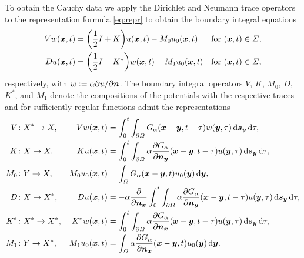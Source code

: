 \documentclass[a4paper,11pt]{article}
\begin{document}
To obtain the Cauchy data we apply the Dirichlet and Neumann trace operators to the representation formula \eqref{eq:repr} to obtain the boundary integral equations \cite{Cos1990,Cos2004,Noo1988,DohNiiSte2018}
\begin{align*}
  Vw({{\bm{x}}},t) &= \bigg(\frac{1}{2} I + K \bigg) u({{\bm{x}}},t) - M_0 u_0({{\bm{x}}},t) &&\text{for } ({{\bm{x}}},t) \in \Sigma, \\
  Du({{\bm{x}}},t) &= \bigg(\frac{1}{2} I - K^\ast \bigg) w({{\bm{x}}},t) - M_1 u_0({{\bm{x}}},t) &&\text{for } ({{\bm{x}}},t) \in \Sigma,
\end{align*}
respectively, with $w := \alpha\partial u/\partial {\ensuremath{{\bm{n}}}} $. The boundary integral operators $V$, $K$, $M_0$, $D$, $K^\ast$, and $M_1$ denote the compositions of the potentials with the respective traces and for sufficiently regular functions admit the representations
\begin{align*}
  V &\colon X^\ast \to X, &Vw({{\bm{x}}},t) &= \int_0^t \int_{\partial\Omega} G_\alpha({{\bm{x}}}-{{\bm{y}}},t-\tau) w({{\bm{y}}},\tau) \,{\mathrm{d}}{{\bm{s}}}_{{\bm{y}}} \,{\mathrm{d}}\tau, \\
  K &\colon X \to X, &Ku({{\bm{x}}},t) &= \int_0^t \int_{\partial\Omega} \alpha\frac{\partial G_\alpha}{\partial {\ensuremath{{\bm{n}}}}_{{\bm{y}}}}({{\bm{x}}}-{{\bm{y}}},t-\tau) u({{\bm{y}}},\tau) \,{\mathrm{d}}{{\bm{s}}}_{{\bm{y}}} \,{\mathrm{d}}\tau, \\
  M_0 &\colon Y \to X, &M_0 u_0({{\bm{x}}},t) &= \int_\Omega G_\alpha({{\bm{x}}}-{{\bm{y}}},t) u_0({{\bm{y}}}) \,{\mathrm{d}}{{\bm{y}}}, \\
  D &\colon X \to X^\ast, &Du({{\bm{x}}},t) &= -\alpha \frac{\partial}{\partial {\ensuremath{{\bm{n}}}}_{{\bm{x}}}} \int_0^t \int_{\partial\Omega} \alpha\frac{\partial G_\alpha}{\partial {\ensuremath{{\bm{n}}}}_{{\bm{y}}}}({{\bm{x}}}-{{\bm{y}}},t-\tau) u({{\bm{y}}},\tau) \,{\mathrm{d}}{{\bm{s}}}_{{\bm{y}}} \,{\mathrm{d}}\tau, \\
  K^\ast &\colon X^\ast \to X^\ast, &K^\ast w({{\bm{x}}},t) &= \int_0^t \int_{\partial\Omega} \alpha\frac{\partial G_\alpha}{\partial {\ensuremath{{\bm{n}}}}_{{\bm{x}}}}({{\bm{x}}}-{{\bm{y}}},t-\tau) u({{\bm{y}}},\tau) \,{\mathrm{d}}{{\bm{s}}}_{{\bm{y}}} \,{\mathrm{d}}\tau, \\
  M_1 &\colon Y \to X^\ast, &M_1 u_0({{\bm{x}}},t) &= \int_\Omega \alpha\frac{\partial G_\alpha}{\partial {\ensuremath{{\bm{n}}}}_{{\bm{x}}}}({{\bm{x}}}-{{\bm{y}}},t) u_0({{\bm{y}}}) \,{\mathrm{d}}{{\bm{y}}}.
\end{align*}
\end{document}
